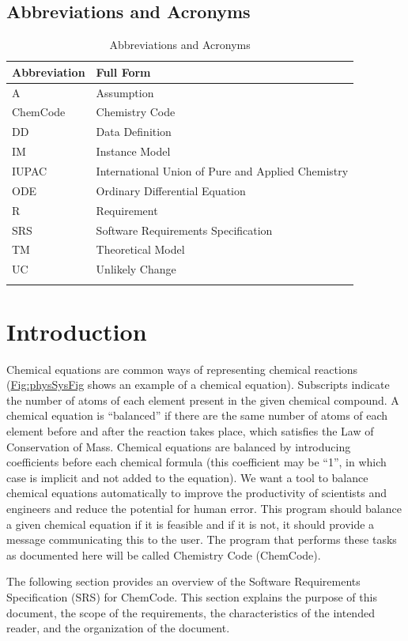 \documentclass[12pt]{article}
\begin{document}
\subsection{Abbreviations and Acronyms}
\label{Sec:TAbbAcc}
\begin{longtable}{l l}
\toprule
\textbf{Abbreviation} & \textbf{Full Form}
\\
\midrule
\endhead
A & Assumption
\\
ChemCode & Chemistry Code
\\
DD & Data Definition
\\
IM & Instance Model
\\
IUPAC & International Union of Pure and Applied Chemistry
\\
ODE & Ordinary Differential Equation
\\
R & Requirement
\\
SRS & Software Requirements Specification
\\
TM & Theoretical Model
\\
UC & Unlikely Change
\\
\bottomrule
\caption{Abbreviations and Acronyms}
\label{Table:TAbbAcc}
\end{longtable}
\section{Introduction}
\label{Sec:Intro}
Chemical equations are common ways of representing chemical reactions (\hyperref[Figure:physSysFig]{Fig:physSysFig} shows an example of a chemical equation). Subscripts indicate the number of atoms of each element present in the given chemical compound. A chemical equation is ``balanced'' if there are the same number of atoms of each element before and after the reaction takes place, which satisfies the Law of Conservation of Mass. Chemical equations are balanced by introducing coefficients before each chemical formula (this coefficient may be ``1'', in which case is implicit and not added to the equation). We want a tool to balance chemical equations automatically to improve the productivity of scientists and engineers and reduce the potential for human error. This program should balance a given chemical equation if it is feasible and if it is not, it should provide a message communicating this to the user. The program that performs these tasks as documented here will be called Chemistry Code (ChemCode).

The following section provides an overview of the Software Requirements Specification (SRS) for ChemCode. This section explains the purpose of this document, the scope of the requirements, the characteristics of the intended reader, and the organization of the document.
\end{document}
